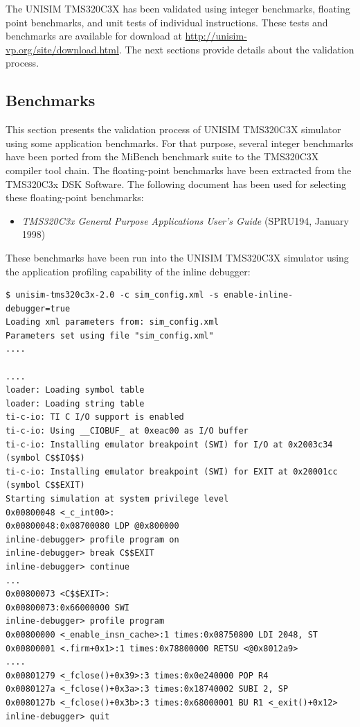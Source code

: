 The UNISIM TMS320C3X has been validated using integer benchmarks, floating point benchmarks, and unit tests of individual instructions.
These tests and benchmarks are available for download at \url{http://unisim-vp.org/site/download.html}.
The next sections provide details about the validation process.

\subsection{Benchmarks}
\label{tms320c3x_benchmarks}

This section presents the validation process of UNISIM TMS320C3X simulator using some application benchmarks.
For that purpose, several integer benchmarks have been ported from the MiBench benchmark suite to the TMS320C3X compiler tool chain.
The floating-point benchmarks have been extracted from the TMS320C3x DSK Software.
The following document has been used for selecting these floating-point benchmarks:
\begin{itemize}
\item \textit{TMS320C3x General Purpose Applications User's Guide} (SPRU194, January 1998)
\end{itemize}

These benchmarks have been run into the UNISIM TMS320C3X simulator using the application profiling capability of the inline debugger:
\begin{verbatim}
$ unisim-tms320c3x-2.0 -c sim_config.xml -s enable-inline-debugger=true
Loading xml parameters from: sim_config.xml
Parameters set using file "sim_config.xml"
....

....
loader: Loading symbol table
loader: Loading string table
ti-c-io: TI C I/O support is enabled
ti-c-io: Using __CIOBUF_ at 0xeac00 as I/O buffer
ti-c-io: Installing emulator breakpoint (SWI) for I/O at 0x2003c34 (symbol C$$IO$$)
ti-c-io: Installing emulator breakpoint (SWI) for EXIT at 0x20001cc (symbol C$$EXIT)
Starting simulation at system privilege level
0x00800048 <_c_int00>:
0x00800048:0x08700080 LDP @0x800000
inline-debugger> profile program on
inline-debugger> break C$$EXIT
inline-debugger> continue
...
0x00800073 <C$$EXIT>:
0x00800073:0x66000000 SWI
inline-debugger> profile program
0x00800000 <_enable_insn_cache>:1 times:0x08750800 LDI 2048, ST                                                                                                                                      
0x00800001 <.firm+0x1>:1 times:0x78800000 RETSU <@0x8012a9>                                                                                                                                          
....
0x00801279 <_fclose()+0x39>:3 times:0x0e240000 POP R4
0x0080127a <_fclose()+0x3a>:3 times:0x18740002 SUBI 2, SP
0x0080127b <_fclose()+0x3b>:3 times:0x68000001 BU R1 <_exit()+0x12>
inline-debugger> quit
\end{verbatim}

